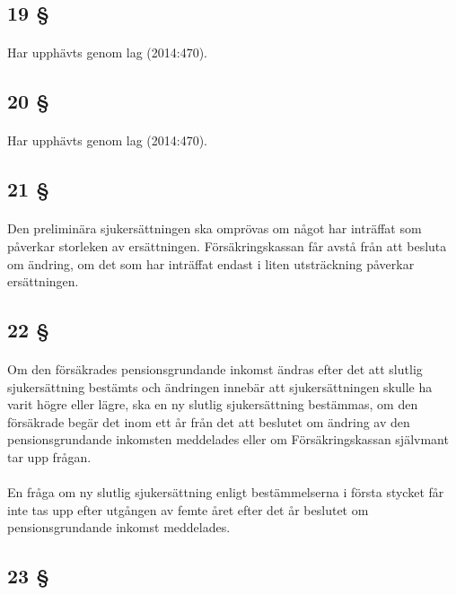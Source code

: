 \documentclass[a4paper,notitlepage,openany,10pt]{book}
\begin{document}
\subsection*{19 §}
\paragraph*{}
Har upphävts genom
lag (2014:470).
\subsection*{20 §}
\paragraph*{}
Har upphävts genom
lag (2014:470).
\subsection*{21 §}
\paragraph*{}
Den preliminära sjukersättningen ska omprövas om något har inträffat som påverkar storleken av ersättningen.
Försäkringskassan får avstå från att besluta om ändring, om det som har inträffat endast i liten utsträckning påverkar ersättningen.
\subsection*{22 §}
\paragraph*{}
Om den försäkrades pensionsgrundande inkomst ändras efter det att slutlig sjukersättning bestämts och ändringen innebär att sjukersättningen skulle ha varit högre eller lägre, ska en ny slutlig sjukersättning bestämmas, om den försäkrade begär det inom ett år från det att beslutet om ändring av den pensionsgrundande inkomsten meddelades eller om Försäkringskassan självmant tar upp frågan.
\paragraph*{}
En fråga om ny slutlig sjukersättning enligt bestämmelserna i första stycket får inte tas upp efter utgången av femte året efter det år beslutet om pensionsgrundande inkomst meddelades.
\subsection*{23 §}
\end{document}
